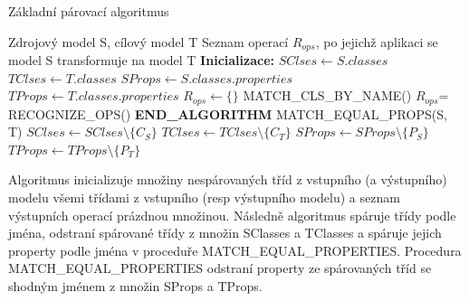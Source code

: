 \documentclass[11pt,twoside,a4paper]{book}
\begin{document}
 \begin{algorithm}
 \caption{Základní párovací algoritmus}\label{algo:matching}

\begin{algorithmic}[1]
   \Require Zdrojový model S, cílový model T
   \Ensure Seznam operací $R_{ops}$, po jejichž aplikaci se model S transformuje
       na model T
   \Statex
   \State \textbf{Inicializace:}
   \State $SClses \gets S.classes$  
   \State $TClses \gets T.classes$ 
   \State $SProps \gets S.classes.properties$ 
   \State $TProps \gets T.classes.properties$ 
   \State $R_{ops} \gets \{\}$
   \Statex	   
   \State MATCH\_CLS\_BY\_NAME()
   \State $R_{ops}$= RECOGNIZE\_OPS()
   \State \textbf{END\_ALGORITHM}
   \Statex
    \label{algo:matching:forEqualCls}
   	        \State MATCH\_EQUAL\_PROPS(S, T) 
   	        \State $SClses \gets SClses \setminus \{ C_S\}$
   	        \State $TClses \gets TClses \setminus \{ C_T\}$   	        
   	     \EndIf
      \EndFor
   \EndFor
  \EndProcedure	      
   \Statex	
   	           \State $SProps \gets SProps \setminus \{ P_S\}$
   	           \State $TProps \gets TProps \setminus \{ P_T\}$
   	        \EndIf
   	      \EndFor
   	   \EndFor
   \EndProcedure  
\end{algorithmic}
\end{algorithm}
\FloatBarrier

Algoritmus inicializuje množiny nespárovaných tříd z vstupního (a výstupního)
modelu všemi třídami z vstupního (resp výstupního modelu) a seznam výstupních
operací prázdnou množinou. Následně algoritmus spáruje třídy podle jména,
odstraní spárované třídy z množin SClasses a TClasses a spáruje jejich property
podle jména v proceduře MATCH\_EQUAL\_PROPERTIES. Procedura
MATCH\_EQUAL\_PROPERTIES odstraní property ze spárovaných tříd se shodným jménem
z množin SProps a TProps.
\end{document}
